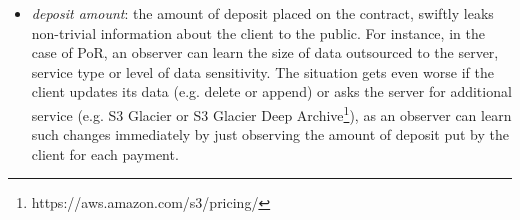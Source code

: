 \begin{itemize}
\begin{itemize}
\item \textit{deposit amount}: the amount of deposit placed on the contract,  swiftly leaks non-trivial  information about the client to the public. For instance, in the case of PoR, an observer can learn the size of data outsourced to the server, service type or level of data sensitivity. The situation gets even worse if the client updates its data (e.g. delete or append) or asks the server for additional service (e.g. S3 Glacier or S3 Glacier Deep Archive\footnote{https://aws.amazon.com/s3/pricing/}), as an observer can learn such changes immediately by just observing the amount of deposit put by the client for each payment.  
\end{itemize}


\end{itemize}


